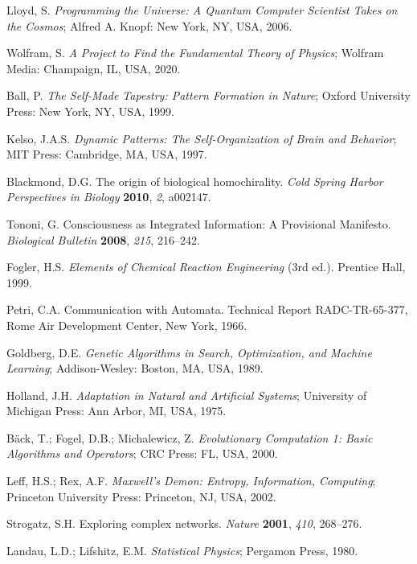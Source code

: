 \documentclass[preprint,12pt]{elsarticle}
\begin{document}
\begin{thebibliography}{999}
Lloyd, S. \textit{Programming the Universe: A Quantum Computer Scientist Takes on the Cosmos}; Alfred A. Knopf: New York, NY, USA, 2006.

Wolfram, S. \textit{A Project to Find the Fundamental Theory of Physics}; Wolfram Media: Champaign, IL, USA, 2020.

Ball, P. \textit{The Self-Made Tapestry: Pattern Formation in Nature}; Oxford University Press: New York, NY, USA, 1999.

Kelso, J.A.S. \textit{Dynamic Patterns: The Self-Organization of Brain and Behavior}; MIT Press: Cambridge, MA, USA, 1997.

Blackmond, D.G. The origin of biological homochirality. \textit{Cold Spring Harbor Perspectives in Biology} \textbf{2010}, \textit{2}, a002147.

Tononi, G. Consciousness as Integrated Information: A Provisional Manifesto. \textit{Biological Bulletin} \textbf{2008}, \textit{215}, 216–242.

Fogler, H.S. \textit{Elements of Chemical Reaction Engineering} (3rd ed.). Prentice Hall, 1999.

Petri, C.A. Communication with Automata. Technical Report RADC-TR-65-377, Rome Air Development Center, New York, 1966.

Goldberg, D.E. \textit{Genetic Algorithms in Search, Optimization, and Machine Learning}; Addison-Wesley: Boston, MA, USA, 1989.

Holland, J.H. \textit{Adaptation in Natural and Artificial Systems}; University of Michigan Press: Ann Arbor, MI, USA, 1975.

Bäck, T.; Fogel, D.B.; Michalewicz, Z. \textit{Evolutionary Computation 1: Basic Algorithms and Operators}; CRC Press: FL, USA, 2000.

Leff, H.S.; Rex, A.F. \textit{Maxwell's Demon: Entropy, Information, Computing}; Princeton University Press: Princeton, NJ, USA, 2002.

Strogatz, S.H. Exploring complex networks. \textit{Nature} \textbf{2001}, \textit{410}, 268–276.

Landau, L.D.; Lifshitz, E.M. \textit{Statistical Physics}; Pergamon Press, 1980.


\end{thebibliography}
\end{document}
